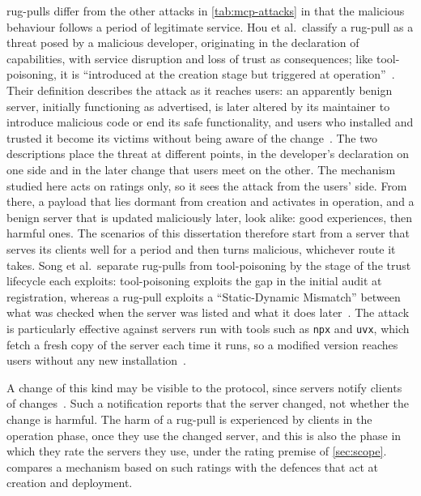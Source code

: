 \Glspl{rug-pull} differ from the other attacks in \cref{tab:mcp-attacks} in that the malicious behaviour follows a period of legitimate service. Hou et al.\ classify a \gls{rug-pull} as a threat posed by a malicious developer, originating in the declaration of capabilities, with service disruption and loss of trust as consequences; like \gls{tool-poisoning}, it is \enquote{introduced at the creation stage but triggered at operation}~\cite[p.~15]{Hou2026}. Their definition describes the attack as it reaches users: an apparently benign server, initially functioning as advertised, is later altered by its maintainer to introduce malicious code or end its safe functionality, and users who installed and trusted it become its victims without being aware of the change~\cite[p.~19]{Hou2026}. The two descriptions place the threat at different points, in the developer's declaration on one side and in the later change that users meet on the other. The mechanism studied here acts on ratings only, so it sees the attack from the users' side. From there, a payload that lies dormant from creation and activates in operation, and a benign server that is updated maliciously later, look alike: good experiences, then harmful ones. The scenarios of this dissertation therefore start from a server that serves its clients well for a period and then turns malicious, whichever route it takes. Song et al.\ separate \glspl{rug-pull} from \gls{tool-poisoning} by the stage of the trust lifecycle each exploits: \gls{tool-poisoning} exploits the gap in the initial audit at registration, whereas a \gls{rug-pull} exploits a \enquote{Static-Dynamic Mismatch} between what was checked when the server was listed and what it does later~\cite[p.~2414]{Song2026}. The attack is particularly effective against servers run with tools such as \texttt{npx} and \texttt{uvx}, which fetch a fresh copy of the server each time it runs, so a modified version reaches users without any new installation~\cite[p.~2414]{Song2026}.

A change of this kind may be visible to the protocol, since servers notify clients of changes~\cite[p.~7]{Hou2026}. Such a notification reports that the server changed, not whether the change is harmful. The harm of a \gls{rug-pull} is experienced by clients in the operation phase, once they use the changed server, and this is also the phase in which they rate the servers they use, under the rating premise of \cref{sec:scope}.  compares a mechanism based on such ratings with the defences that act at creation and deployment.

